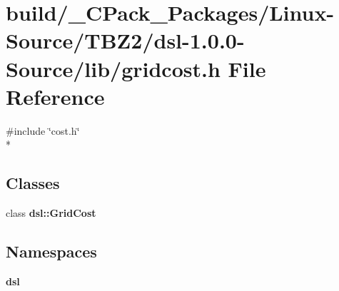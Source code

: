 \section{build/\-\_\-\-C\-Pack\-\_\-\-Packages/\-Linux-\/\-Source/\-T\-B\-Z2/dsl-\/1.0.0-\/\-Source/lib/gridcost.h File Reference}
\label{build_2__CPack__Packages_2Linux-Source_2TBZ2_2dsl-1_80_80-Source_2lib_2gridcost_8h}
{\ttfamily \#include \char`\"{}cost.\-h\char`\"{}}\\*
\subsection*{Classes}
\begin{DoxyCompactItemize}
\item 
class {\bf dsl\-::\-Grid\-Cost}
\end{DoxyCompactItemize}
\subsection*{Namespaces}
\begin{DoxyCompactItemize}
\item 
{\bf dsl}
\end{DoxyCompactItemize}
